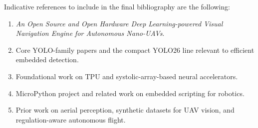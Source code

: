 Indicative references to include in the final bibliography are the
following:

\begin{enumerate}
\def\labelenumi{\arabic{enumi}.}
\tightlist
\item
  \emph{An Open Source and Open Hardware Deep Learning-powered Visual
  Navigation Engine for Autonomous Nano-UAVs}.
\item
  Core YOLO-family papers and the compact YOLO26 line relevant to
  efficient embedded detection.
\item
  Foundational work on TPU and systolic-array-based neural accelerators.
\item
  MicroPython project and related work on embedded scripting for
  robotics.
\item
  Prior work on aerial perception, synthetic datasets for UAV vision,
  and regulation-aware autonomous flight.
\end{enumerate}
